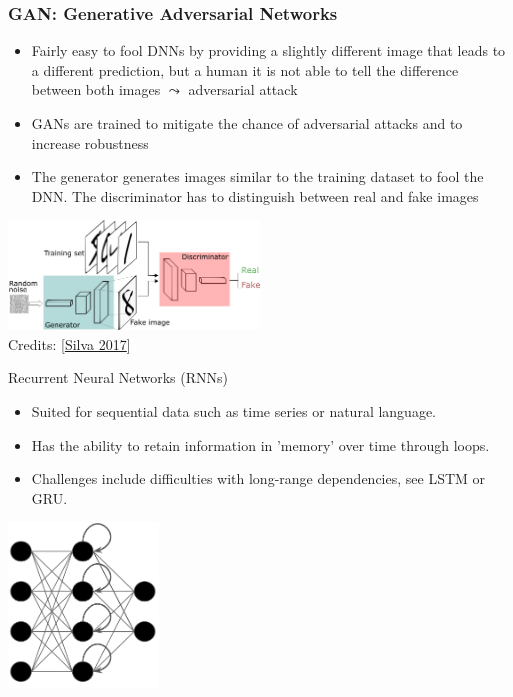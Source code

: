 \documentclass[aspectratio=169]{../latex_main/tntbeamer}  %
\begin{document}
        \begin{frame}
        \frametitle{GAN: Generative Adversarial Networks}
        \begin{itemize}
            \item Fairly easy to fool DNNs by providing a slightly different image that leads to a different prediction, but a human it is not able to tell the difference between both images $\leadsto$ adversarial attack
            \item GANs are trained to mitigate the chance of adversarial attacks and to increase robustness 
            \item The generator generates images similar to the training dataset to fool the DNN. The discriminator has to distinguish between real and fake images
        \end{itemize}
        \centering
        \includegraphics[width=0.5\textwidth]{figures/gans.png}\\
        Credits: [\href{https://sthalles.github.io/intro-to-gans/}{Silva 2017}]
        \end{frame}

        \begin{frame}{Recurrent Neural Networks (RNNs)}
        \begin{itemize}
            \item Suited for sequential data such as time series or natural language.
            \item Has the ability to retain information in 'memory' over time through loops.
            \item Challenges include difficulties with long-range dependencies, see LSTM or GRU.
        \end{itemize}
        \centering
        \includegraphics[width=0.3\textwidth]{figures/rnn.png}
        \end{frame}
\end{document}
